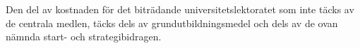 \documentclass[11pt,a4paper]{article}
\begin{document}
Den del av kostnaden för det biträdande universitetslektoratet som inte täcks av de centrala medlen, täcks dels av grundutbildningsmedel och dels av de ovan nämnda start- och strategibidragen. 



\end{document}
